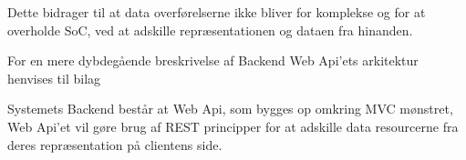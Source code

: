 \noindent Dette bidrager til at data overførelserne ikke bliver for komplekse og for at overholde SoC, ved at adskille repræsentationen og dataen fra hinanden.

For en mere dybdegående breskrivelse af Backend Web Api'ets arkitektur henvises til bilag \parencite[][Section 7.4]{TekniskBilag}

Systemets Backend består at Web Api, som bygges op omkring MVC mønstret, Web Api’et vil gøre brug af REST principper for at adskille data resourcerne fra deres repræsentation på clientens side.

\newpage
